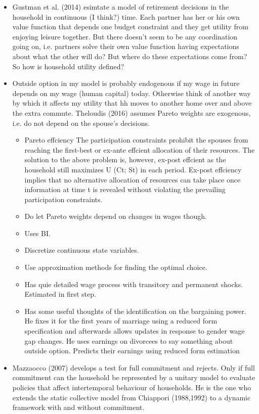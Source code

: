 \begin{itemize}
\item Gustman et al. (2014) esimtate a model of retirement decisions in the household in continuous (I think?) time. Each partner has her or his own value function that depends one budget constraint and they get utility from enjoying leisure together. But there doesn't seem to be any coordination going on, i.e. partners solve their own value function having expectations about what the other will do? But where do these expectations come from? So how is household utility defined?
\item Outside option in my model is probably endogenous if my wage in future depends on my wage (human capital) today. Otherwise think of another way by which it affects my utility that hh moves to another home over and above the extra commute. Theloudis (2016) assumes Pareto weights are exogenous, i.e. do not depend on the spouse's decisions.
\begin{itemize}
\item Pareto effciency The participation constraints prohibit the spouses from reaching the first-best or ex-ante effcient allocation of their resources. The solution to the above problem is, however, ex-post effcient as the household still maximizes U (Ct; St) in each period. Ex-post effciency implies that no alternative allocation of resources can take place once information at time t is revealed without violating the prevailing participation constraints.
\item Do let Pareto weights depend on changes in wages though. 
\item Uses BI.
\item Discretize continuous state variables.
\item Use approximation methods for finding the optimal choice.
\item Has quie detailed wage process with transitory and permanent shocks. Estimated in first step.
\item Has some useful thoughts of the identification on the bargaining power. He fixes it for the first years of marriage using a reduced form specification and afterwards allows updates in response to gender wage gap changes. He uses earnings on divorcees to say something about outside option. Predicts their earnings using reduced form estimation
\end{itemize}
\item Mazzaocco (2007) develops a test for full commitment and rejects. Only if full commitment can the household be represented by a unitary model to evaluate policies that affect intertemporal behaviour of households. He is the one who extends the static collective model from Chiappori (1988,1992) to a dynamic framework with and without commitment.

\end{itemize}
